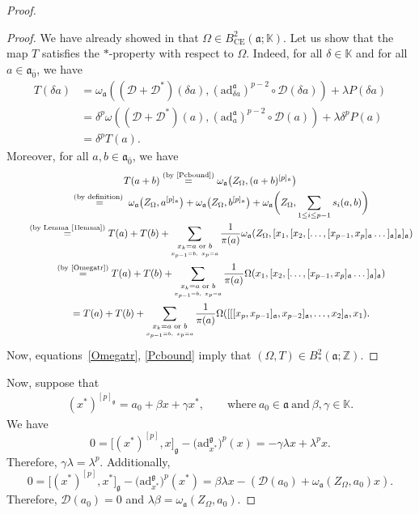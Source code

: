 \documentclass[pdftex]{sigma}
\numberwithin{equation}{section}
\begin{document}
\begin{proof}
\begin{proof}
We have already showed in \cite{BM} that $\Omega \in B^2_{\text{CE}}(\mathfrak{a}; \mathbb K)$. Let us show that the
map $T$ satisfies the $*$-property with respect to $\Omega$. Indeed, for all $\delta \in \mathbb K$ and for all $a\in \mathfrak{a}_{\bar 0}$, we have
\begin{align*}
T(\delta a) & = \omega_\mathfrak{a} (({\mathscr D}+{\mathscr D}^*)(\delta a),(\mathrm{ad}_{\delta a}^\mathfrak{a})^{p-2} \circ {\mathscr D}(\delta a)) + \lambda P(\delta a) \\
 & = \delta^p \omega (({\mathscr D}+{\mathscr D}^*)(a),(\mathrm{ad}_{ a}^\mathfrak{a})^{p-2} \circ {\mathscr D}(a)) + \lambda \delta^p P(a) \\
 & =\delta^p T(a).
\end{align*}
Moreover, for all $a,b\in \mathfrak{a}_{\bar 0}$, we have
\begin{gather*}
T(a+b) \overset{\text{(by~\eqref{Pcbound})}}{=} \omega_\mathfrak{a}\bigl(Z_\Omega, (a+b)^{[p]_\mathfrak{a}}\bigr)\\
\qquad{}\overset{\text{(by definition) }}{=} \omega_\mathfrak{a}\bigl(Z_\Omega, a^{[p]_\mathfrak{a}}\bigr) + \omega_\mathfrak{a}\bigl(Z_\Omega, b^{[p]_\mathfrak{a}}\bigr)+ \omega_\mathfrak{a}\bigg(Z_\Omega, \sum_{1\leq i \leq p-1}s_i(a,b) \bigg) \\
\qquad{} \overset{\text{(by Lemma \ref{1lemma})}}{=}{} T(a)+T(b)
 + \sum_{\underset{x_{p-1}=b,~x_p=a}{x_k=a \text{ or } b}}\frac{1}{\pi(a)} \omega_\mathfrak{a}(Z_\Omega, [x_1,[x_2,[\dots ,[x_{p-1},x_p]_\mathfrak{a}\dots ]_\mathfrak{a}]_\mathfrak{a}]_\mathfrak{a}) \\
\qquad{}\overset{\text{(by~\eqref{Omegatr})}}{=} T(a)+T(b) + \sum_{\underset{x_{p-1}=b,~x_p=a}{x_k=a \text{ or } b}}\frac{1}{\pi(a)} \Omega ( x_1,[x_2,[\dots ,[x_{p-1},x_p]_\mathfrak{a}\dots ]_\mathfrak{a}]_\mathfrak{a}) \\
\qquad{} = T(a)+T(b) + \sum_{\underset{x_{p-1}=b,~x_p=a}{x_k=a \text{ or } b}}\frac{1}{\pi(a)} \Omega ( [[[x_p,x_{p-1}]_\mathfrak{a},x_{p-2}]_\mathfrak{a},\dots ,x_2]_\mathfrak{a}, x_1).
\end{gather*}
Now, equations~\eqref{Omegatr}, \eqref{Pcbound} imply that $(\Omega, T)\in B^2_*(\mathfrak{a}; \mathbb Z)$.
\end{proof}


Now, suppose that
\begin{gather*}%
(x^*)^{[p]_\mathfrak{g}}=a_0+\beta x+\gamma x^*,\qquad \text{where}\ a_0\in \mathfrak{a} \ \text{and}\ \beta, \gamma \in \mathbb{K}.
\end{gather*}
We have
\[
0=\big[(x^*)^{[p]},x\big]_\mathfrak{g}-\bigl(\mathrm{ad}_{x^*}^\mathfrak{g}\bigr)^p(x)= -\gamma \lambda x+ \lambda^px.
\]
Therefore, $\gamma \lambda= \lambda^p$. Additionally,
\[
0=\big[(x^*)^{[p]},x^*\big]_\mathfrak{g}-\bigl(\mathrm{ad}_{x^*}^\mathfrak{g}\bigr)^p(x^*)= \beta \lambda x- ({\mathscr D}(a_0)+\omega_\mathfrak{a} (Z_\Omega, a_0)x).
\]
Therefore, ${\mathscr D}(a_0)=0$ and $\lambda \beta= \omega_\mathfrak{a} (Z_\Omega, a_0)$.


\end{proof}
\end{document}

